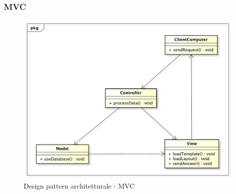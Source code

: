 		\subsubsection{MVC} %
		\begin{figure}[htbp]
			\centering
			\centerline{\includegraphics[scale=0.5]{./images/designpatternappendice/mvc.pdf}}
			\caption{Design pattern architetturale - MVC}
		\end{figure}

